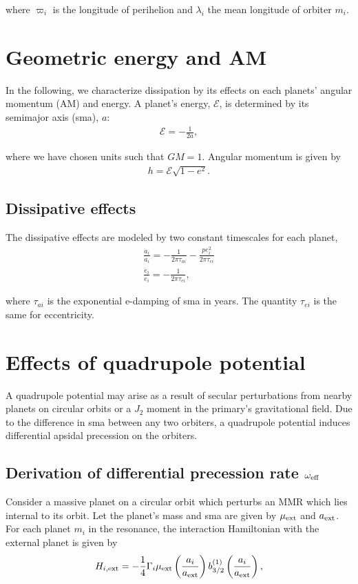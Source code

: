 \documentclass[11pt]{article}
\begin{document}
\noindent
where \(\varpi_i\) is the longitude of perihelion and \(\lambda_i\) the mean longitude
of orbiter \(m_i\).

\section{Geometric energy and AM}
\label{sec:orge26c6e9}
In the following, we characterize dissipation by its effects on each
planets' angular momentum (AM) and energy.  A planet's energy,
\(\mathcal E\), is determined by its semimajor axis (sma), \(a\):
\begin{align}
   \mathcal E = -\frac{1}{2a},
\end{align}
\noindent

\noindent
where we have chosen units such that \(GM=1\).
Angular momentum is given by
\begin{align}
h = \mathcal E \sqrt{1-e^2}.
\end{align}

\subsection{Dissipative effects}
\label{sec:orgdd6cbc2}
The dissipative effects are modeled
by two constant timescales for each planet, 
\begin{align}
  \frac{\dot a_i}{a_i} = -\frac{1}{2\pi\tau_{ai}} - \frac{pe_i^2}{2\pi\tau_{ei}} \\
  \frac{\dot e_i}{e_i} = -\frac{1}{2\pi\tau_{ei}} ,
\end{align}

where \(\tau_{ai}\) is the exponential e-damping of sma in years.  The
quantity \(\tau_{ei}\) is the same for eccentricity.

\section{Effects of quadrupole potential}
\label{sec:org4f45204}
A quadrupole potential may arise as a result of secular perturbations
from nearby planets on circular orbits or a \(J_2\) moment in the
primary's gravitational field. Due to the difference in sma
between any two orbiters, a quadrupole potential induces
differential apsidal precession on the orbiters.

\subsection{Derivation of differential precession rate \(\omega_{\rm eff}\)}
\label{sec:orgb88bf5a}
Consider a massive planet on a circular orbit which perturbs an MMR
which lies internal to its orbit.  Let the planet's mass and sma are
given by \(\mu_{\rm ext}\) and \(a_{\rm ext}\).  For each planet \(m_i\) in
the resonance, the interaction Hamiltonian with the external
planet is given by
\begin{equation}
  H_{i,\rm ext} = -\frac14 \Gamma_i \mu_{\rm ext}
  \left(\frac{a_i}{a_{\rm ext}}\right) b_{3/2}^{(1)}\left(\frac{a_i}{a_{\rm ext}}\right),
\end{equation}
\end{document}
